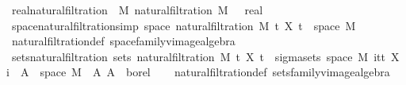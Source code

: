 \begin{isabellebody}
\isamarkupfalse%
\ {\isachardoublequoteopen}real{\isacharunderscore}{\kern0pt}natural{\isacharunderscore}{\kern0pt}filtration\ {\isasymequiv}\ {\isasymlambda}M{\isachardot}{\kern0pt}\ natural{\isacharunderscore}{\kern0pt}filtration\ M\ {\isacharparenleft}{\kern0pt}{}\ {\isacharcolon}{\kern0pt}{\isacharcolon}{\kern0pt}\ real{\isacharparenright}{\kern0pt}{\isachardoublequoteclose}\isanewline
\isanewline
{}\isamarkupfalse%
\ space{\isacharunderscore}{\kern0pt}natural{\isacharunderscore}{\kern0pt}filtration{\isacharbrackleft}{\kern0pt}simp{\isacharbrackright}{\kern0pt}{\isacharcolon}{\kern0pt}\ {\isachardoublequoteopen}space\ {\isacharparenleft}{\kern0pt}natural{\isacharunderscore}{\kern0pt}filtration\ M\ t\ X\ t{\isacharparenright}{\kern0pt}\ {\isacharequal}{\kern0pt}\ space\ M{\isachardoublequoteclose}%
\isadelimproof
\ %
\endisadelimproof
%
\isatagproof
{}\isamarkupfalse%
\ natural{\isacharunderscore}{\kern0pt}filtration{\isacharunderscore}{\kern0pt}def\ space{\isacharunderscore}{\kern0pt}family{\isacharunderscore}{\kern0pt}vimage{\isacharunderscore}{\kern0pt}algebra\ \isacommand{{\isachardot}{\kern0pt}{\isachardot}{\kern0pt}}\isamarkupfalse%
%
\endisatagproof
{\isafoldproof}%
%
\isadelimproof
%
\endisadelimproof
\isanewline
\isanewline
{}\isamarkupfalse%
\ sets{\isacharunderscore}{\kern0pt}natural{\isacharunderscore}{\kern0pt}filtration{\isacharcolon}{\kern0pt}\ {\isachardoublequoteopen}sets\ {\isacharparenleft}{\kern0pt}natural{\isacharunderscore}{\kern0pt}filtration\ M\ t\ X\ t{\isacharparenright}{\kern0pt}\ {\isacharequal}{\kern0pt}\ sigma{\isacharunderscore}{\kern0pt}sets\ {\isacharparenleft}{\kern0pt}space\ M{\isacharparenright}{\kern0pt}\ {\isacharparenleft}{\kern0pt}{\isasymUnion}i{\isasymin}{\isacharbraceleft}{\kern0pt}tt{\isacharbraceright}{\kern0pt}{\isachardot}{\kern0pt}\ {\isacharbraceleft}{\kern0pt}X\ i\ {\isacharminus}{\kern0pt}{\isacharbackquote}{\kern0pt}\ A\ {\isasyminter}\ space\ M\ {\isacharbar}{\kern0pt}\ A{\isachardot}{\kern0pt}\ A\ {\isasymin}\ borel{\isacharbraceright}{\kern0pt}{\isacharparenright}{\kern0pt}{\isachardoublequoteclose}\isanewline
%
\isadelimproof
\ \ %
\endisadelimproof
%
\isatagproof
{}\isamarkupfalse%
\ natural{\isacharunderscore}{\kern0pt}filtration{\isacharunderscore}{\kern0pt}def\ sets{\isacharunderscore}{\kern0pt}family{\isacharunderscore}{\kern0pt}vimage{\isacharunderscore}{\kern0pt}algebra\ \isamarkupfalse%

\end{isabellebody}
